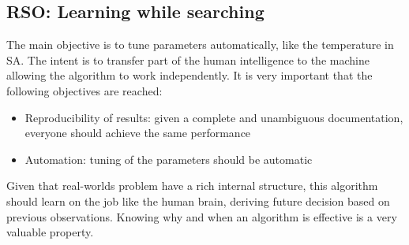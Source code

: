 \documentclass[11pt]{article}
\begin{document}
\subsection{RSO: Learning while searching}
The main objective is to tune parameters automatically, like the temperature in SA. The intent is to transfer part of the human intelligence to the machine allowing the algorithm to work independently. It is very important that the following objectives are reached:
\begin{itemize}
\item{Reproducibility of results: given a complete and unambiguous documentation, everyone should achieve the same performance}
\item{Automation: tuning of the parameters should be automatic}
\end{itemize}
Given that real-worlds problem have a rich internal structure, this algorithm should learn on the job like the human brain, deriving future decision based on previous observations. Knowing why and when an algorithm is effective is a very valuable property. 
\end{document}

